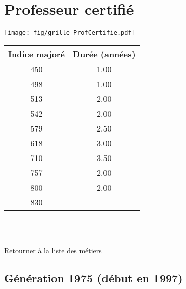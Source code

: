 \newpage 
 
\chapter{Professeur certifié} 

\begin{minipage}{0.55\linewidth}\texttt{[image: fig/grille\_ProfCertifie.pdf]}\end{minipage} 
\begin{minipage}{0.3\linewidth} 
 \begin{center} 

\begin{tabular}[htb]{|c|c|} 
\hline 
 Indice majoré &  Durée (années) \\ 
\hline \hline 
 450 &  1.00 \\ 
\hline 
 498 &  1.00 \\ 
\hline 
 513 &  2.00 \\ 
\hline 
 542 &  2.00 \\ 
\hline 
 579 &  2.50 \\ 
\hline 
 618 &  3.00 \\ 
\hline 
 710 &  3.50 \\ 
\hline 
 757 &  2.00 \\ 
\hline 
 800 &  2.00 \\ 
\hline 
 830 &   \\ 
\hline 
\hline 
\end{tabular} 
\end{center} 
 \end{minipage} 

~\\ 
 


   
 \localtableofcontents 

~\\ 
 
 \hyperlink{page.2}{\noindent Retourner à la liste des métiers}

 \newpage 

\section{Génération 1975 (début en 1997)\label{ProfCertifie_100_22_1975_0}} 
 
